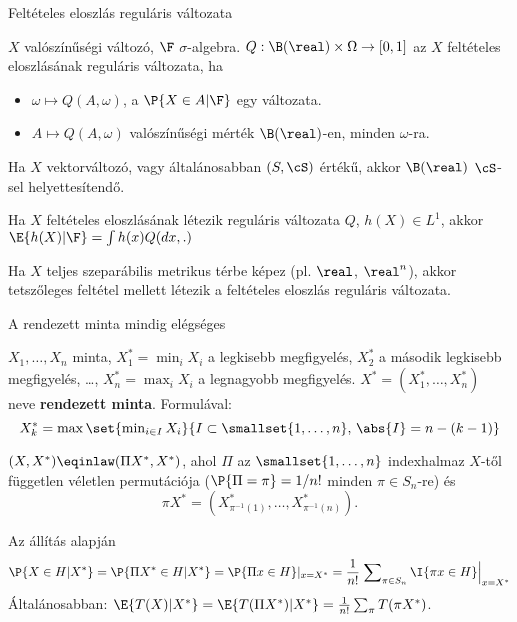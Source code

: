 \documentclass[aspectratio=169,notheorems,9pt,\option]{beamer}
\begin{document}
\begin{frame}{Feltételes eloszlás reguláris változata}
  \begin{df}
    $X$ valószínűségi változó, $\F$ $\sigma$-algebra. $Q:\B(\real)\times\Omega\to[0,1]$ az $X$ feltételes 
    eloszlásának reguláris változata, ha 
    \begin{itemize}[<*>]
      \item $\omega\mapsto Q(A,\omega)$, a $\P{X\in A|\F}$ egy változata.
      \item $A\mapsto Q(A,\omega)$ valószínűségi mérték $\B(\real)$-en, minden $\omega$-ra.  
    \end{itemize}
  \end{df}
  \continue
  Ha $X$ vektorváltozó, vagy  általánosabban $(S,\cS)$ értékű, akkor $\B(\real)$ $\cS$-sel helyettesítendő. 
  \begin{proposition}
    Ha $X$ feltételes eloszlásának létezik reguláris változata $Q$, $h(X)\in L^1$, akkor $\E{h(X)|\F}=\int h(x) Q(dx,.)$
  \end{proposition}
  
  \begin{theorem}
    Ha $X$ teljes szeparábilis metrikus térbe képez (pl. $\real$, $\real^n$), akkor tetszőleges feltétel 
    mellett létezik a feltételes eloszlás reguláris változata.
  \end{theorem}
  
\end{frame}

\begin{frame}{A rendezett minta mindig elégséges}
  \begin{df}
    $X_1,\dots,X_n$ minta, 
    $X_1^*=\min_i X_i$ a legkisebb megfigyelés,  
    $X_2^*$ a második legkisebb megfigyelés, \ldots, $X_n^*=\max_i X_i$ 
    a legnagyobb megfigyelés.
    $X^*=(X_1^*,\dots,X_n^*)$ neve \textbf{rendezett minta}. 
    Formulával:
    \begin{displaymath}
      X_k^*=\max\set{\min\nolimits_{i\in I} X_i}{I\subset\smallset{1,\dots,n},\, \abs{I}=n-(k-1)} 
    \end{displaymath}
  \end{df}
  \begin{proposition}
    $(X,X^*)\eqinlaw(\Pi X^*,X^*)$, ahol $\Pi$ az $\smallset{1,\dots,n}$ indexhalmaz 
    $X$-től független véletlen permutációja ($\P{\Pi=\pi}=1/n!$ minden $\pi\in S_n$-re) és 
    \begin{displaymath}
      \pi X^*=(X^*_{\pi^{-1}(1)},\dots,X^*_{\pi^{-1}(n)}).
    \end{displaymath}
  \end{proposition}
  \continue
  Az állítás alapján
  \begin{displaymath}
    \P{X\in H|X^*}=\P{\Pi X^*\in H|X^*}=\P{\Pi x\in H}|_{x=X^*}
    =\frac1{n!}\left.\sum\nolimits_{\pi\in S_n} \I{\pi x\in H}\right|_{x=X^*}
  \end{displaymath}
  Általánosabban: $\E{T(X)|X^*}=\E{T(\Pi X^*)|X^*}=\frac1{n!}\sum_{\pi} T(\pi X^*)$.
\end{frame}
\end{document}
